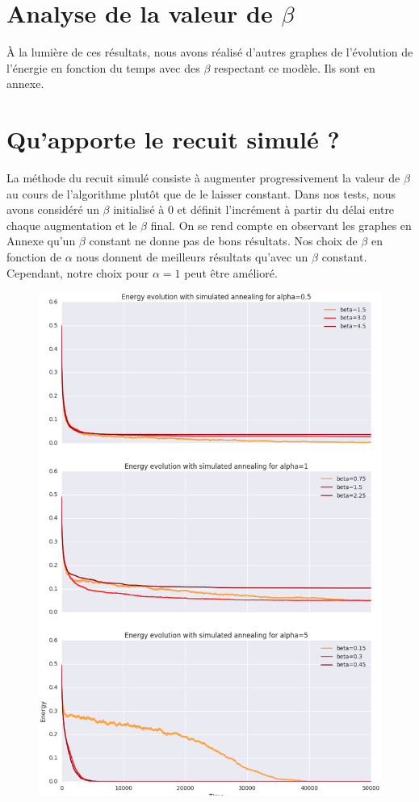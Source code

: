 \documentclass[twocolumn]{article}
\begin{document}
	\section{Analyse de la valeur de $\beta$}
	
		À la lumière de ces résultats, nous avons réalisé d'autres graphes de l'évolution de l'énergie en fonction du temps avec des $\beta$ respectant ce modèle. Ils sont en annexe.
	\section{Qu'apporte le recuit simulé ?}
		La méthode du recuit simulé consiste à augmenter progressivement la valeur de $\beta$ au cours de l'algorithme plutôt que de le laisser constant. Dans nos tests, nous avons considéré un $\beta$ initialisé à 0 et définit l'incrément à partir du délai entre chaque augmentation et le $\beta$ final.
		On se rend compte en observant les graphes en Annexe qu'un $\beta$ constant ne donne pas de bons résultats.  Nos choix de $\beta$ en fonction de $\alpha$ nous donnent de meilleurs résultats qu'avec un $\beta$ constant. Cependant, notre choix pour $\alpha = 1$ peut être amélioré.
		
		\begin{figure}
		\includegraphics[width=\columnwidth]{../tobekept/ex1_sim_1683536997971113732-r.png}
		\end{figure}
		
\end{document}
